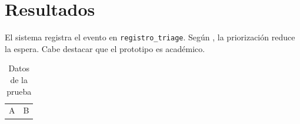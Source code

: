 \section{Resultados}
El sistema registra el evento en \texttt{registro\_triage}. Según \textcite{rodriguez2018}, la priorización reduce la espera. Cabe destacar que el prototipo es académico.

\begin{table}
\caption{Datos de la prueba}
\begin{tabular}{ll}
A & B \\
\end{tabular}
\end{table}
